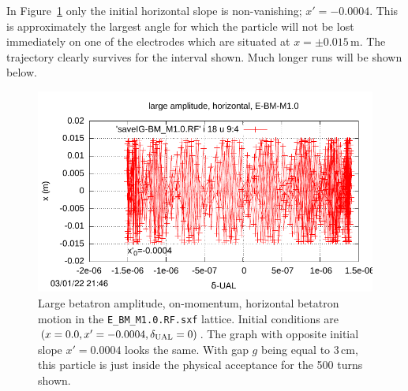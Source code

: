 \documentclass[]{article}
\begin{document}
In Figure~\ref{fig:PureBetatron_BM_Z} only 
the initial horizontal slope is non-vanishing; $x'=-0.0004$. 
This is approximately the largest angle for which the
particle will not be lost immediately on one of the electrodes
which are situated at $x=\pm0.015\,$m.
The trajectory clearly survives for the interval shown.
Much longer runs will be shown below.

%
\begin{figure}[h]
\begin{minipage}[b]{\linewidth}
\centering
\includegraphics[scale=0.8]{pdf/BM-III_Figure11.pdf}
\end{minipage}
\caption{\label{fig:PureBetatron_BM_Z}Large betatron amplitude,
on-momentum, horizontal betatron motion 
in the {\tt E\_BM\_M1.0.RF.sxf} lattice. 
Initial conditions are $(x=0.0,x'=-0.0004,\delta_{\rm UAL}=0)$.
The graph with opposite initial slope $x'=0.0004$ looks the same.
With gap $g$ being equal to 3\,cm,
this particle is just inside the physical acceptance for
the 500 turns shown.
}
\end{figure}
%
\end{document}
